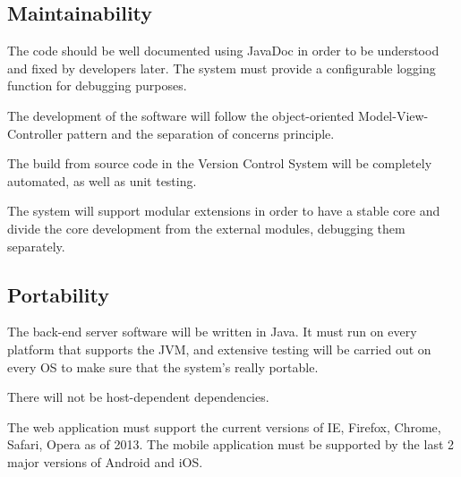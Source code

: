 \subsection{Maintainability}


The code should be well documented using JavaDoc in order to be understood and fixed by developers later.
The system must provide a configurable logging function for debugging purposes.

The development of the software will follow the object-oriented Model-View-Controller pattern and the separation of concerns principle.

The build from source code in the Version Control System will be completely automated, as well as unit testing.

The system will support modular extensions in order to have a stable core and divide the core development from the external modules, debugging them separately.

\subsection{Portability}

The back-end server software will be written in Java. It must run on every platform that supports the JVM, and extensive testing will be carried out on every OS to make sure that the system's really portable.

There will not be host-dependent dependencies.

The web application must support the current versions of IE, Firefox, Chrome, Safari, Opera as of 2013.
The mobile application must be supported by the last 2 major versions of Android and iOS.
